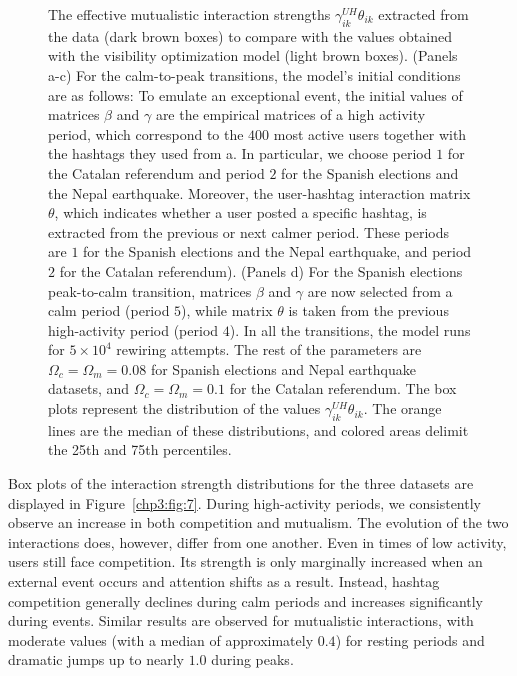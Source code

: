 \begin{figure}
    \caption[Effective interactions recovered from the visibility optimization model]{The effective mutualistic interaction strengths $\gamma^{UH}_{ik}\theta_{ik}$ extracted from the data (dark brown boxes) to compare with the values obtained with the visibility optimization model (light brown boxes). (Panels a-c) For the calm-to-peak transitions, the model's initial conditions are as follows: 
To emulate an exceptional event, the initial values of matrices $\beta$ and $\gamma$  are the empirical matrices of a high activity period, which correspond to the $400$ most active users together with the hashtags they used from a. In particular, we choose period $1$ for the Catalan referendum and period $2$ for the Spanish elections and the Nepal earthquake. Moreover, the user-hashtag interaction matrix $\theta$, which indicates whether a user posted a specific hashtag, is extracted from the previous or next calmer period. These periods are $1$ for the Spanish elections and the Nepal earthquake, and period $2$  for the Catalan referendum). (Panels d) For the Spanish elections peak-to-calm transition, matrices $\beta$ and $\gamma$  are now selected from a calm period  (period $5$), while matrix $\theta$ is taken from the previous high-activity period (period $4$).  In all the transitions, the model runs for $5 \times 10^4$ rewiring attempts. The rest of the parameters are $\Omega_c = \Omega_m = 0.08$ for Spanish elections and Nepal earthquake datasets, and $\Omega_c = \Omega_m = 0.1$ for the Catalan referendum. The box plots represent the distribution of the values $\gamma^{UH}_{ik}\theta_{ik}$. The orange lines are the median of these distributions, and colored areas delimit the 25th and 75th percentiles.}
   \label{chp3:fig:9}
\end{figure}

Box plots of the interaction strength distributions for the three datasets are displayed in Figure~\ref{chp3:fig:7}. During high-activity periods, we consistently observe an increase in both competition and mutualism. The evolution of the two interactions does, however, differ from one another. Even in times of low activity, users still face competition. Its strength is only marginally increased when an external event occurs and attention shifts as a result. Instead, hashtag competition generally declines during calm periods and increases significantly during events. Similar results are observed for mutualistic interactions, with moderate values (with a median of approximately $0.4$) for resting periods and dramatic jumps up to nearly $1.0$ during peaks. \\

